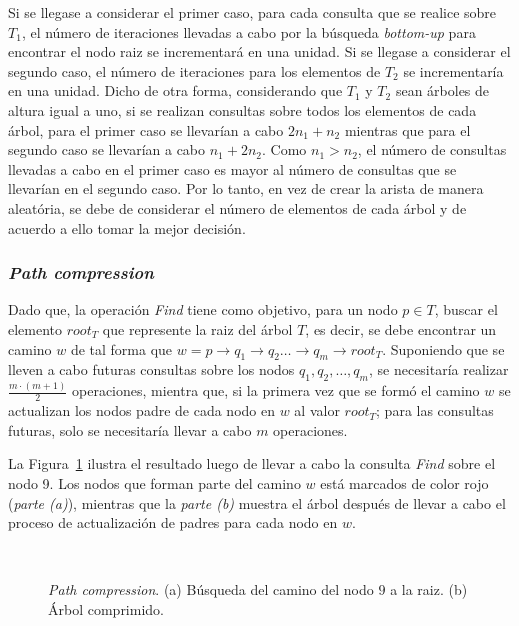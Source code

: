 Si se llegase a considerar el primer caso, para cada consulta que se realice
sobre $T_1$, el número de iteraciones llevadas a cabo por la búsqueda
\textit{bottom-up} para encontrar el nodo raiz se incrementará en una unidad.
Si se llegase a considerar el segundo caso, el número de iteraciones para los
elementos de $T_2$ se incrementaría en una unidad. Dicho de otra forma, 
considerando que $T_1$ y $T_2$ sean árboles de altura igual a uno, si se
realizan consultas sobre todos los elementos de cada árbol, para el primer
caso se llevarían a cabo $2 n_1 + n_2$ mientras que para el segundo
caso se llevarían a cabo $n_1 + 2 n_2$. Como $n_1 > n_2$, el número de 
consultas llevadas a cabo en el primer caso es mayor al número de consultas 
que se llevarían en el segundo caso. Por lo tanto, en vez de crear la arista
de manera aleatória, se debe de considerar el número de elementos de cada
árbol y de acuerdo a ello tomar la mejor decisión.

\subsubsection{\textit{Path compression}}
Dado que, la operación \textit{Find} tiene como objetivo, para un nodo
$p \in T$, buscar el elemento $root_T$ que represente la raiz del árbol $T$,
es decir, se debe encontrar un camino $w$ de tal forma que 
$w = p\rightarrow q_1 \rightarrow q_2 \dots \rightarrow q_m \rightarrow root_T$. 
Suponiendo que se lleven a cabo futuras consultas sobre los nodos
$q_1, q_2, \dots, q_m$, se necesitaría realizar $\frac{m \cdot (m + 1)}{2}$ 
operaciones, mientra que, si la primera vez que se formó el camino $w$ se 
actualizan los nodos padre de cada nodo en $w$ al valor $root_T$; para las 
consultas futuras, solo se necesitaría llevar a cabo $m$ operaciones.

La Figura~\ref{fig:cap-segmentacion:UF_path} ilustra el resultado luego de 
llevar a cabo la consulta \textit{Find} sobre el nodo 9. Los nodos que forman 
parte del camino $w$ está marcados de color rojo (\textit{parte (a)}), 
mientras que la \textit{parte (b)} muestra el árbol después de llevar a cabo 
el proceso de actualización de padres para cada nodo en $w$.

\begin{figure}[h!]
  \centering
	 { \, \, \, \, }
   \\ 
	\caption[\textit{Path compression}]{\textit{Path compression}. (a) Búsqueda 
	del camino del nodo $9$ a la raiz. (b) Árbol comprimido.}
	\label{fig:cap-segmentacion:UF_path}
\end{figure}

